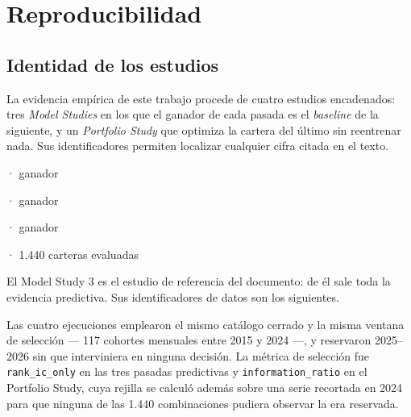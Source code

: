 \chapter{Reproducibilidad}
\label{anexo:reproducibilidad}

\section{Identidad de los estudios}

La evidencia empírica de este trabajo procede de cuatro estudios encadenados: tres \textit{Model
Studies} en los que el ganador de cada pasada es el \textit{baseline} de la siguiente, y un
\textit{Portfolio Study} que optimiza la cartera del último sin reentrenar nada. Sus identificadores
permiten localizar cualquier cifra citada en el texto.

\begin{description}[leftmargin=3.2cm,style=nextline,font=\normalfont\ttfamily]
  \item[Model Study 1] \studyidA{} · ganador 
  \item[Model Study 2] \studyidB{} · ganador 
  \item[Model Study 3] \studyidC{} · ganador 
  \item[Portfolio Study] \studyportfolio{} · 1.440 carteras evaluadas
\end{description}

El Model Study 3 es el estudio de referencia del documento: de él sale toda la evidencia predictiva.
Sus identificadores de datos son los siguientes.

\begin{description}[leftmargin=3.2cm,style=nextline,font=\normalfont\ttfamily]
  \item[dataset\_hash] 
  \item[evaluation\_key] 
  \item[catalog\_hash] 
\end{description}

Las cuatro ejecuciones emplearon el mismo catálogo cerrado y la misma ventana de selección --- 117
cohortes mensuales entre 2015 y 2024 ---, y reservaron 2025--2026 sin que interviniera en ninguna
decisión. La métrica de selección fue \texttt{rank\_ic\_only} en las tres pasadas predictivas y
\texttt{information\_ratio} en el Portfolio Study, cuya rejilla se calculó además sobre una serie
recortada en 2024 para que ninguna de las 1.440 combinaciones pudiera observar la era reservada.

